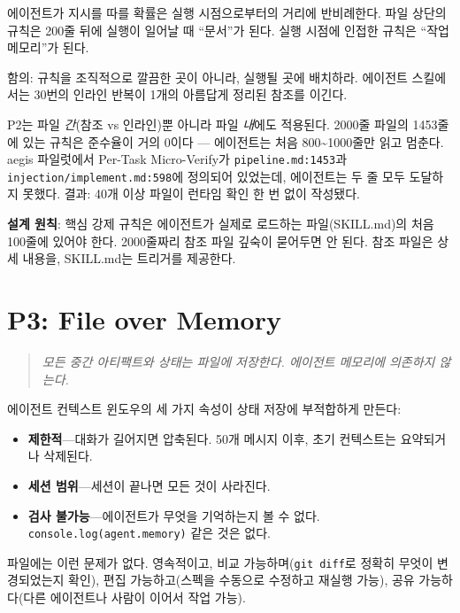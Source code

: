 \documentclass[11pt,a4paper,openright,twoside]{report}
\begin{document}
에이전트가 지시를 따를 확률은 실행 시점으로부터의 거리에 반비례한다. 파일 상단의 규칙은 200줄 뒤에 실행이 일어날 때 ``문서''가 된다. 실행 시점에 인접한 규칙은 ``작업 메모리''가 된다.

함의: 규칙을 조직적으로 깔끔한 곳이 아니라, 실행될 곳에 배치하라. 에이전트 스킬에서는 30번의 인라인 반복이 1개의 아름답게 정리된 참조를 이긴다.

\begin{warnbox}
P2는 파일 \emph{간}(참조 vs 인라인)뿐 아니라 파일 \emph{내}에도 적용된다. 2000줄 파일의 1453줄에 있는 규칙은 준수율이 거의 0이다 --- 에이전트는 처음 800\textasciitilde1000줄만 읽고 멈춘다. aegis 파일럿에서 Per-Task Micro-Verify가 \texttt{pipeline.md:1453}과 \texttt{injection/implement.md:598}에 정의되어 있었는데, 에이전트는 두 줄 모두 도달하지 못했다. 결과: 40개 이상 파일이 런타임 확인 한 번 없이 작성됐다.

\textbf{설계 원칙}: 핵심 강제 규칙은 에이전트가 실제로 로드하는 파일(SKILL.md)의 처음 100줄에 있어야 한다. 2000줄짜리 참조 파일 깊숙이 묻어두면 안 된다. 참조 파일은 상세 내용을, SKILL.md는 트리거를 제공한다.
\end{warnbox}


\section{P3: File over Memory}

\begin{quote}
\emph{모든 중간 아티팩트와 상태는 파일에 저장한다. 에이전트 메모리에 의존하지 않는다.}
\end{quote}

에이전트 컨텍스트 윈도우의 세 가지 속성이 상태 저장에 부적합하게 만든다:

\begin{itemize}
  \item \textbf{제한적}---대화가 길어지면 압축된다. 50개 메시지 이후, 초기 컨텍스트는 요약되거나 삭제된다.
  \item \textbf{세션 범위}---세션이 끝나면 모든 것이 사라진다.
  \item \textbf{검사 불가능}---에이전트가 무엇을 기억하는지 볼 수 없다. \texttt{console.log(agent.memory)} 같은 것은 없다.
\end{itemize}

파일에는 이런 문제가 없다. 영속적이고, 비교 가능하며(\texttt{git diff}로 정확히 무엇이 변경되었는지 확인), 편집 가능하고(스펙을 수동으로 수정하고 재실행 가능), 공유 가능하다(다른 에이전트나 사람이 이어서 작업 가능).
\end{document}
